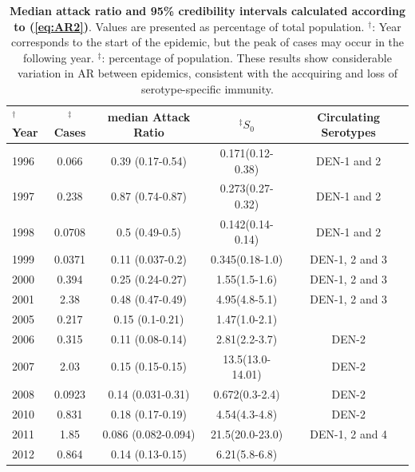 \documentclass[10pt]{article}
\begin{document}
\begin{table}[!ht]
\caption{
{\bf Median attack ratio and 95\% credibility intervals calculated according to 
(\ref{eq:AR2})}. 
Values are presented as percentage of total population. 
$^\dag$: Year corresponds to the start of the epidemic, but the peak of cases
may occur in the following year.
$^\ddag$: percentage of population.
These results show considerable variation in AR between epidemics, consistent 
with
the accquiring and loss of serotype-specific immunity.}
\begin{center}
\begin{tabular}{l|c|c|c|c}
\hline
$^\dag$Year & $^\ddag$Cases & median Attack Ratio & $^\ddag$$S_0$ & Circulating 
 Serotypes \\
\hline
1996 & 0.066 & 0.39 (0.17-0.54) & 0.171(0.12-0.38)& DEN-1 and 
2\citep{nogueira1999dengue}\\
1997 & 0.238 & 0.87 (0.74-0.87) & 0.273(0.27-0.32)& DEN-1 and 
2\citep{nogueira1999dengue}\\
1998 & 0.0708 & 0.5 (0.49-0.5) & 0.142(0.14-0.14)& DEN-1 and 
2\citep{nogueira1999dengue}\\
1999 & 0.0371 & 0.11 (0.037-0.2) & 0.345(0.18-1.0)&DEN-1, 2 and 
3\citep{de2004dengue}\\
2000 & 0.394 & 0.25 (0.24-0.27) & 1.55(1.5-1.6)&DEN-1, 2 and 
3\citep{de2004dengue}\\
2001 & 2.38 & 0.48 (0.47-0.49) & 4.95(4.8-5.1)&DEN-1, 2 and 
3\citep{de2004dengue}\\
2005 & 0.217 & 0.15 (0.1-0.21) & 1.47(1.0-2.1)&\\
2006 & 0.315 & 0.11 (0.08-0.14) & 
2.81(2.2-3.7)&DEN-2\citep{nogueira2011dengue}\\
2007 & 2.03 & 0.15 (0.15-0.15) & 
13.5(13.0-14.01)&DEN-2\citep{nogueira2011dengue}\\
2008 & 0.0923 & 0.14 (0.031-0.31) & 
0.672(0.3-2.4)&DEN-2\citep{nogueira2011dengue}\\
2010 & 0.831 & 0.18 (0.17-0.19) & 
4.54(4.3-4.8)&DEN-2\citep{nogueira2011dengue}\\
2011 & 1.85 & 0.086 (0.082-0.094) & 
21.5(20.0-23.0)&DEN-1, 2 and 4\citep{nogueira2011dengue}\\
2012 & 0.864 & 0.14 (0.13-0.15) & 6.21(5.8-6.8)&\\

\hline
\end{tabular}
\end{center}
\label{tab:AR}
\end{table}
\end{document}
